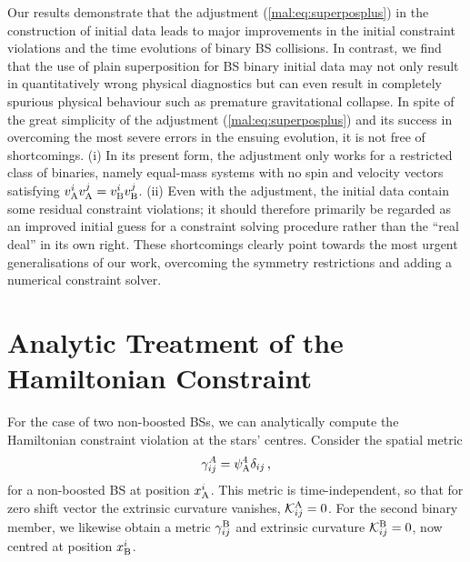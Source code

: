 Our results demonstrate that
the adjustment (\ref{mal:eq:superposplus}) in the construction of initial
data leads to major improvements in the initial constraint violations and the
time evolutions of binary BS collisions. In contrast, we find that the use of plain
superposition for BS binary initial data may not only result in quantitatively
wrong physical diagnostics but can even result in completely spurious physical behaviour
such as premature gravitational collapse. In spite of the great simplicity of the
adjustment (\ref{mal:eq:superposplus}) and its success in overcoming the most
severe errors in the ensuing evolution, it is not free of shortcomings.
(i) In its present form, the adjustment only works for a restricted class of
binaries, namely equal-mass systems with no spin and velocity vectors
satisfying $v_{\rm A}^i v_{\rm A}^j=v_{\rm B}^i v_{\rm B}^j$. (ii) Even with
the adjustment, the initial data contain some residual constraint violations;
it should therefore primarily be regarded as an improved initial guess for
a constraint solving procedure rather than the ``real deal'' in its own right.
These shortcomings clearly point towards the most urgent generalisations of our
work, overcoming the symmetry restrictions and adding a numerical constraint
solver.



\section{Analytic Treatment of the Hamiltonian Constraint}
\label{mal:sec:hamanalytic}

For the case of two non-boosted BSs, we can analytically
compute the Hamiltonian constraint violation
at the stars' centres. Consider the spatial metric
%
%
\begin{equation}
    \gamma_{ij}^{A} = \psi_{\rm A}^4 \delta_{ij}\,,\label{mal:eqn:appendixansatzmetric}
\end{equation}
%
for a non-boosted BS at position $x_{\rm A}^i$.
This metric is time-independent,
so that for zero shift vector the extrinsic curvature vanishes,
%
${\mathcal{K}}_{ij}^{\rm A} = 0$. 
%
For the second binary member, we likewise obtain a
metric $\gamma^{\rm B}_{ij}$ and extrinsic curvature
${\mathcal{K}}^{\rm B}_{ij}=0$, now centred at position $x_{\rm B}^i$.

